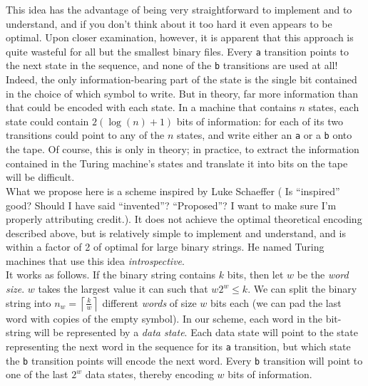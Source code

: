 \documentclass[11pt]{article}
\begin{document}
This idea has the advantage of being very straightforward to implement and to understand, and if you don't think about it too hard it even appears to be optimal. Upon closer examination, however, it is apparent that this approach is quite wasteful for all but the smallest binary files. Every \texttt{a} transition points to the next state in the sequence, and none of the \texttt{b} transitions are used at all! Indeed, the only information-bearing part of the state is the single bit contained in the choice of which symbol to write. But in theory, far more information than that could be encoded with each state. In a machine that contains $n$ states, each state could contain $2(\log(n) + 1)$ bits of information: for each of its two transitions could point to any of the $n$ states, and write either an \texttt{a} or a \texttt{b} onto the tape. Of course, this is only in theory; in practice, to extract the information contained in the Turing machine's states and translate it into bits on the tape will be difficult. \\

What we propose here is a scheme inspired by Luke Schaeffer ({\color{red} Is ``inspired'' good? Should I have said ``invented''? ``Proposed''? I want to make sure I'm properly attributing credit.}). It does not achieve the optimal theoretical encoding described above, but is relatively simple to implement and understand, and is within a factor of 2 of optimal for large binary strings. He named Turing machines that use this idea \emph{introspective}.  \\

It works as follows. If the binary string contains $k$ bits, then let $w$ be the \emph{word size}. $w$ takes the largest value it can such that $w2^w \le k$. We can split the binary string into $n_w = \left \lceil{\frac{k}{w}}\right \rceil$ different \emph{words} of size $w$ bits each (we can pad the last word with copies of the empty symbol). In our scheme, each word in the bit-string will be represented by a \emph{data state}. Each data state will point to the state representing the next word in the sequence for its \texttt{a} transition, but which state the \texttt{b} transition points will encode the next word. Every \texttt{b} transition will point to one of the last $2^w$ data states, thereby encoding $w$ bits of information. \\
\end{document}
